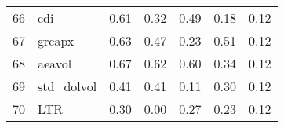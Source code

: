 \documentclass[12pt]{article}
\begin{document}
\begin{footnotesize}
\begin{longtable}{rl|c|c|c|c|c}
				66                   & cdi                         & 0.61                             & 0.32                                                                                          & 0.49                                                                                          & 0.18                                                                                          & 0.12                                                                                                   \\
				67                   & grcapx                      & 0.63                             & 0.47                                                                                          & 0.23                                                                                          & 0.51                                                                                          & 0.12                                                                                                   \\
				68                   & aeavol                      & 0.67                             & 0.62                                                                                          & 0.60                                                                                          & 0.34                                                                                          & 0.12                                                                                                   \\
				69                   & std\_dolvol                 & 0.41                             & 0.41                                                                                          & 0.11                                                                                          & 0.30                                                                                          & 0.12                                                                                                   \\
				70                   & LTR                         & 0.30                             & 0.00                                                                                          & 0.27                                                                                          & 0.23                                                                                          & 0.12                                                                                                   \\

\end{longtable}
\end{footnotesize}
\end{document}

